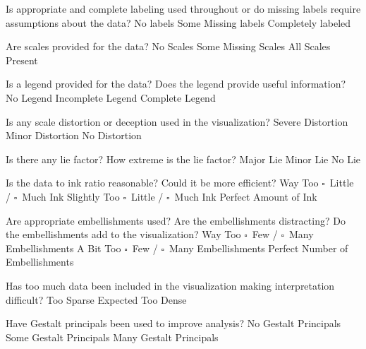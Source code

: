 \documentclass[a4paper,12pt]{article}
\begin{document}
\EndTable  

\vspace{15pt}


   	{Is appropriate and complete labeling used throughout or do 
      	missing labels require assumptions about the data?}
    {\choice No labels}
    {\choice Some Missing labels}
    {\choice Completely labeled} 
        
   	{Are scales provided for the data?}
	{\choice No Scales}
	{\choice Some Missing Scales}
	{\choice All Scales Present} 

	{Is a legend provided for the data? Does the legend provide useful 
    	information?}
	{\choice No Legend}
	{\choice Incomplete Legend}
	{\choice Complete Legend} 
        
        
\EndTable  



	{Is any scale distortion or deception used in the visualization?}	
	{\choice Severe Distortion}
	{\choice Minor Distortion}
	{\choice No Distortion} 
        
	{Is there any lie factor? How extreme is the lie factor?}
	{\choice Major Lie}
	{\choice Minor Lie}
	{\choice No Lie} 

	{Is the data to ink ratio reasonable? Could it be more efficient?}
	{Way Too $\square$~Little / $\square$~Much Ink}
	{Slightly Too $\square$~Little / $\square$~Much Ink}
	{\choice Perfect Amount of Ink} 
        
	{Are appropriate embellishments used? Are the embellishments 
    	distracting? Do the embellishments add to the visualization?}
	{Way Too $\square$~Few / $\square$~Many Embellishments}
	{A Bit Too $\square$~Few / $\square$~Many Embellishments}
	{\choice Perfect Number of Embellishments} 
        
	{Has too much data been included in the visualization making 
    	interpretation difficult? } 
	{\choice Too Sparse}
	{\choice Expected}
	{\choice Too Dense} 
        
	{Have Gestalt principals been used to improve analysis?}
	{\choice No Gestalt Principals}
	{\choice Some Gestalt Principals}
	{\choice Many Gestalt Principals} 
        
\EndTable  
 
\end{document}
